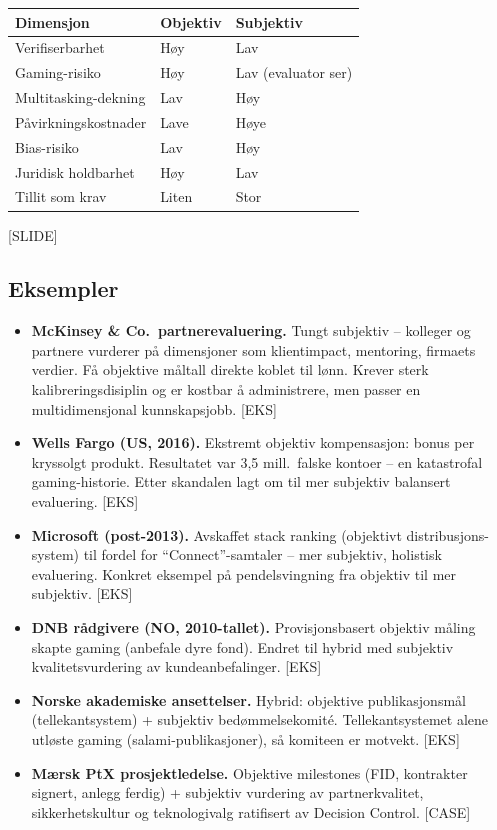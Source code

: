 \begin{center}
\renewcommand{\arraystretch}{1.2}
\begin{tabular}{@{}p{3.0cm}p{5.0cm}p{5.0cm}@{}}
\toprule
\textbf{Dimensjon} & \textbf{Objektiv} & \textbf{Subjektiv} \\
\midrule
Verifiserbarhet & Høy & Lav \\
Gaming-risiko & Høy & Lav (evaluator ser) \\
Multitasking-dekning & Lav & Høy \\
Påvirkningskostnader & Lave & Høye \\
Bias-risiko & Lav & Høy \\
Juridisk holdbarhet & Høy & Lav \\
Tillit som krav & Liten & Stor \\
\bottomrule
\end{tabular}
\end{center}
[SLIDE]

\subsection*{Eksempler}
\begin{itemize}
\item \textbf{McKinsey \& Co.\ partnerevaluering.} Tungt subjektiv -- kolleger og partnere vurderer på dimensjoner som klientimpact, mentoring, firmaets verdier. Få objektive måltall direkte koblet til lønn. Krever sterk kalibreringsdisiplin og er kostbar å administrere, men passer en multidimensjonal kunnskapsjobb. [EKS]
\item \textbf{Wells Fargo (US, 2016).} Ekstremt objektiv kompensasjon: bonus per kryssolgt produkt. Resultatet var 3,5 mill.\ falske kontoer -- en katastrofal gaming-historie. Etter skandalen lagt om til mer subjektiv balansert evaluering. [EKS]
\item \textbf{Microsoft (post-2013).} Avskaffet stack ranking (objektivt distribusjons-system) til fordel for ``Connect''-samtaler -- mer subjektiv, holistisk evaluering. Konkret eksempel på pendelsvingning fra objektiv til mer subjektiv. [EKS]
\item \textbf{DNB rådgivere (NO, 2010-tallet).} Provisjonsbasert objektiv måling skapte gaming (anbefale dyre fond). Endret til hybrid med subjektiv kvalitetsvurdering av kundeanbefalinger. [EKS]
\item \textbf{Norske akademiske ansettelser.} Hybrid: objektive publikasjonsmål (tellekantsystem) + subjektiv bedømmelsekomité. Tellekantsystemet alene utløste gaming (salami-publikasjoner), så komiteen er motvekt. [EKS]
\item \textbf{Mærsk PtX prosjektledelse.} Objektive milestones (FID, kontrakter signert, anlegg ferdig) + subjektiv vurdering av partnerkvalitet, sikkerhetskultur og teknologivalg ratifisert av Decision Control. [CASE]
\end{itemize}

